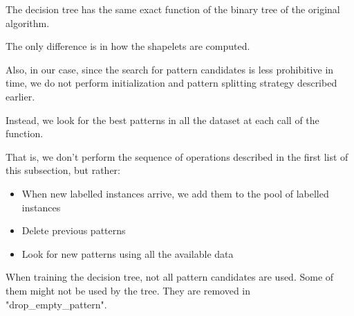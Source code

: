 The decision tree has the same exact function of the binary tree of the original algorithm. 

The only difference is in how the shapelets are computed.

Also, in our case, since the search for pattern candidates is less prohibitive in time, we do not 
perform initialization and pattern splitting strategy described earlier.

Instead, we look for the best patterns in all the dataset at each call of the function.

That is, we don't perform the sequence of operations described in the first list of this subsection, but rather:
\begin{itemize}
    \item When new labelled instances arrive, we add them to the pool of labelled instances
    \item Delete previous patterns 
    \item Look for new patterns using all the available data 
\end{itemize}

When training the decision tree, not all pattern candidates are used. Some of them might not be 
used by the tree. They are removed in "drop\_empty\_pattern".


